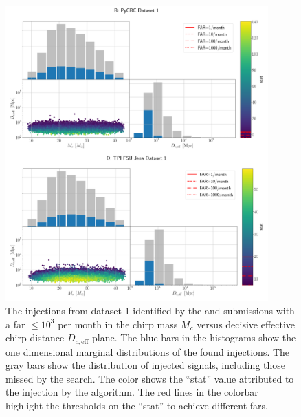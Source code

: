 \begin{figure}
    \centering
    \includegraphics[width=0.9\textwidth]{chapters/mdc/images/mcd_found_ds1_pycbc_TPI_FSU_Jena.pdf}
    \caption[Found-missed chirp mass versus distance]{The injections from dataset 1 identified by the \pycbc and \jena submissions with a \acrshort{far} $\leq 10^3$ per month in the chirp mass $M_c$ versus decisive effective chirp-distance $D_{c,\text{eff}}$ plane. The blue bars in the histograms show the one dimensional marginal distributions of the found injections. The gray bars show the distribution of injected signals, including those missed by the search. The color shows the ``stat'' value attributed to the injection by the algorithm. The red lines in the colorbar highlight the thresholds on the ``stat'' to achieve different \acrshort{far}s.}
    \label{fig:ds1md}
\end{figure}

